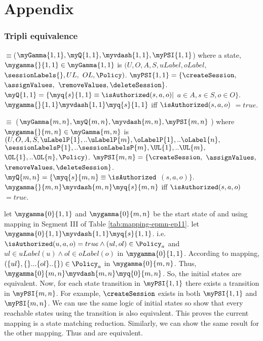 \section{Appendix}
\vspace{-1.5em}

\vspace{-1.5em}
\subsubsection{Tripli equivalence}
\EPOneOneModels{}  $\equiv $($\myGamma{1,1}, \myQ{1,1}, \myvdash{1,1}, \myPSI{1,1}$) where a state,  $ \mygamma{}{1,1} \in \myGamma{1,1}$ is  $(U, O, A, S, uLabel, oLabel,$ $ \sessionLabels{},  UL,$  $ OL, \Policy)$. $\myPSI{1,1} =  \{\createSession,$ $ \assignValues,$ $ \removeValues, \deleteSession\}$. $\myQ{1,1}=\{ \myq{s}{1,1} \equiv \isAuthorized(s, a, o)|$  $ a\in A, s \in S, o \in O \}$. $\mygamma{}{1,1} \myvdash{1,1} \myq{s}{1,1}$ iff $\isAuthorized(s,a,o)$ $=true$. 

\EPMNModel{} $\equiv$ ($\myGamma{m,n}, \myQ{m,n}, \myvdash{m,n},\myPSI{m,n}$ ) where  $ \mygamma{}{m,n} \in \myGamma{m,n}$ is  $(U, O, A, S, \uLabelP{1},..\uLabelP{m}, \oLabelP{1},..\oLabel{n},$ $ \sessionLabelsP{1},..\sessionLabelsP{m},  \UL{1},..\UL{m},$  $ \OL{1},..\OL{n}, \Policy)$. $\myPSI{m,n} =  \{\createSession,$ $ \assignValues,$ $ \removeValues, \deleteSession\}$. $\myQ{m,n}=\{ \myq{s}{m,n} \equiv \isAuthorized$ $(s, a, o) \}$. $\mygamma{}{m,n} \myvdash{m,n} \myq{s}{m,n}$ iff $\isAuthorized(s,a,o)$ $=true$.

let $\mygamma{0}{1,1}$ and $\mygamma{0}{m,n}$ be the start state of \EPOneOneModels{} and \EPMNModel{} using mapping in Segment III of Table \ref{tab:mapping-epmn-ep11}. let $\mygamma{0}{1,1} \myvdash{1,1} \myq{s}{1,1}$. i.e. $ \isAuthorized(u,a,o) = true \land (ul,ol) \in \Policy_a$ and $ul \in uLabel(u) \land ol \in oLabel(o)$ in $\mygamma{0}{1,1}$. According to mapping, $(\{ul\},\{\}... \{ol\}.. \{\}) \in \Policy_a$ in $\mygamma{0}{m,n}$. Thus, $\mygamma{0}{m,n} \myvdash{m,n} \myq{0}{m,n}$. So, the initial states are equivalent. Now, for each state transition in $\myPSI{1,1}$ there exists a transition in $\myPSI{m,n}$. For example, $\createSession$ exists in both $\myPSI{1,1}$ and $\myPSI{m,n}$. We can use the same logic of initial states so show that every reachable states using the transition is also equivalent. This proves the current mapping is a state matching reduction. Similarly, we can show the same result for the other mapping. Thus \EPOneOneModels{} and \EPMNModel{} are equivalent.

\vspace{-1em}
%